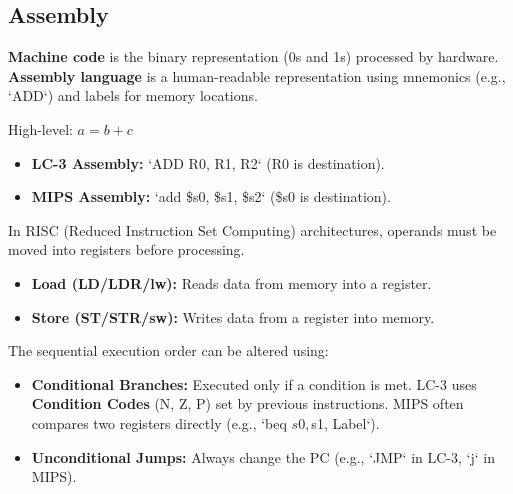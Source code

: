 \subsection{Assembly}

\begin{definition}
\textbf{Machine code} is the binary representation (0s and 1s) processed by hardware. \textbf{Assembly language} is a human-readable representation using mnemonics (e.g., `ADD`) and labels for memory locations.
\end{definition}

\begin{example}
High-level: $a = b + c$
\begin{itemize}
    \item \textbf{LC-3 Assembly:} `ADD R0, R1, R2` (R0 is destination).
    \item \textbf{MIPS Assembly:} `add \$s0, \$s1, \$s2` (\$s0 is destination).
\end{itemize}
\end{example}

\begin{important}
In RISC (Reduced Instruction Set Computing) architectures, operands must be moved into registers before processing.
\begin{itemize}
    \item \textbf{Load (LD/LDR/lw):} Reads data from memory into a register.
    \item \textbf{Store (ST/STR/sw):} Writes data from a register into memory.
\end{itemize}
\end{important}

\begin{remark}
The sequential execution order can be altered using:
\begin{itemize}
    \item \textbf{Conditional Branches:} Executed only if a condition is met. LC-3 uses \textbf{Condition Codes} (N, Z, P) set by previous instructions. MIPS often compares two registers directly (e.g., `beq $s0, $s1, Label`).
    \item \textbf{Unconditional Jumps:} Always change the PC (e.g., `JMP` in LC-3, `j` in MIPS).
\end{itemize}
\end{remark}